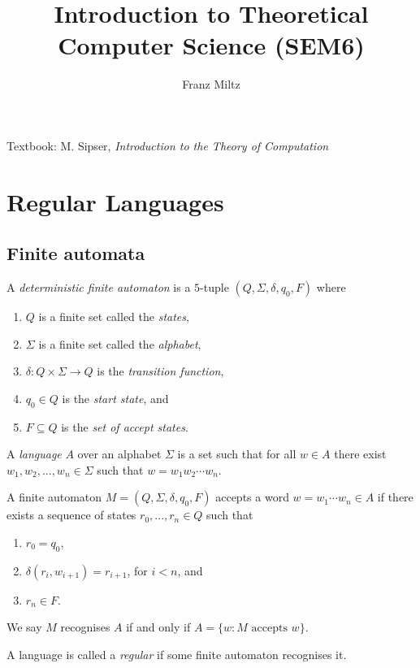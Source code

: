 \documentclass{article}
\title{Introduction to Theoretical Computer Science (SEM6)}
\author{Franz Miltz}
\begin{document}
\maketitle
\noindent Textbook: M. Sipser, \emph{Introduction to the Theory of Computation}
\tableofcontents
\pagebreak

\section{Regular Languages}

\subsection{Finite automata}

\begin{definition*}
	A \emph{deterministic finite automaton} is a $5$-tuple $(Q,\Sigma,\delta,q_0,F)$ where
	\begin{enumerate}
		\item $Q$ is a finite set called the \emph{states},
		\item $\Sigma$ is a finite set called the \emph{alphabet},
		\item $\delta:Q\times\Sigma\to Q$ is the \emph{transition function},
		\item $q_0\in Q$ is the \emph{start state}, and
		\item $F\subseteq Q$ is the \emph{set of accept states}.
	\end{enumerate}
\end{definition*}

\begin{definition*}
	A \emph{language} $A$ over an alphabet $\Sigma$ is a set such that for all
	$w\in A$ there exist $w_1,w_2,...,w_n\in\Sigma$ such that $w=w_1w_2\cdots w_n$.

	A finite automaton $M=(Q,\Sigma,\delta,q_0,F)$ accepts a word $w=w_1\cdots w_n\in A$
	if there exists a sequence of states $r_0,...,r_n\in Q$ such that
	\begin{enumerate}
		\item $r_0=q_0$,
		\item $\delta(r_i,w_{i+1})=r_{i+1}$, for $i<n$, and
		\item $r_n\in F$.
	\end{enumerate}
	We say $M$ recognises $A$ if and only if $A=\{w : M\text{ accepts }w\}$.
\end{definition*}

\begin{definition*}
	A language is called a \emph{regular} if some finite automaton recognises it.
\end{definition*}
\end{document}
